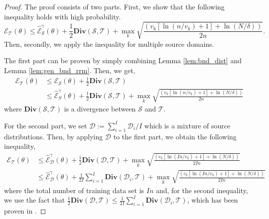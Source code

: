 \begin{proof}
The proof consists of two parts.
First, we show that the following inequality holds with high probability.
$$
\mathcal{E}_{\mathcal{T}}(\theta) \leq \hat{\mathcal{E}}_{\mathcal{S}}^{\gamma}(\theta) + \frac{1}{2}\mathbf{Div}\left(\mathcal{S},\mathcal{T}\right)+ \max_{k}\sqrt{\frac{\left(v_{k}\left[\ln\left(n/v_{k}\right)+1\right]+\ln\left(N/\delta\right)\right)}{2n}}.
$$
Then, secondly, we apply the inequality for multiple source domains.

The first part can be proven by simply combining Lemma \ref{lem:bnd_dist} and Lemma \ref{lem:gen_bnd_rrm}.
Then, we get,
\begin{align}
\mathcal{E}_{\mathcal{T}}(\theta) &\leq \mathcal{E}_{\mathcal{S}}(\theta) + \frac{1}{2}\mathbf{Div}\left(\mathcal{S},\mathcal{T}\right)\\
&\leq \hat{\mathcal{E}}^{\gamma}_{S}(\theta) + \frac{1}{2}\mathbf{Div}\left(\mathcal{S},\mathcal{T}\right) + \max_{k}\sqrt{\frac{\left(v_{k}\left[\ln\left(n/v_{k}\right)+1\right]+\ln\left(N/\delta\right)\right)}{2n}}
\end{align}
where $\mathbf{Div}\left(\mathcal{S},\mathcal{T}\right)$ is a divergence between $\mathcal{S}$ and $\mathcal{T}$.

For the second part, we set $\mathcal{D}:=\sum_{i=1}^{I}\mathcal{D}_{i}/I$ which is a mixture of source distributions.
Then, by applying $\mathcal{D}$ to the first part, we obtain the following inequality,
\begin{align}
\mathcal{E}_{\mathcal{T}}(\theta) &\leq \hat{\mathcal{E}}^{\gamma}_{\mathcal{D}}(\theta) + \frac{1}{2}\mathbf{Div}\left(\mathcal{D},\mathcal{T}\right) + \max_{k}\sqrt{\frac{\left(v_{k}\left[\ln\left(In/v_{k}\right)+1\right]+\ln\left(N/\delta\right)\right)}{2In}}\\
&\leq \hat{\mathcal{E}}^{\gamma}_{\mathcal{D}}(\theta) + \frac{1}{2I}\sum_{i=1}^{I}\mathbf{Div}\left(\mathcal{D}_{i},\mathcal{T}\right) + \max_{k}\sqrt{\frac{\left(v_{k}\left[\ln\left(In/v_{k}\right)+1\right]+\ln\left(N/\delta\right)\right)}{2In}} 
\end{align}
where the total number of training data set is $In$ and, for the second inequality, we use the fact that $\frac{1}{2}\mathbf{Div}\left(\mathcal{D},\mathcal{T}\right)\leq \frac{1}{2I}\sum_{i=1}^{I}\mathbf{Div}\left(\mathcal{D}_{i},\mathcal{T}\right)$, which has been proven in \cite{zhao2018multi_domain_adapt}.
\end{proof}

